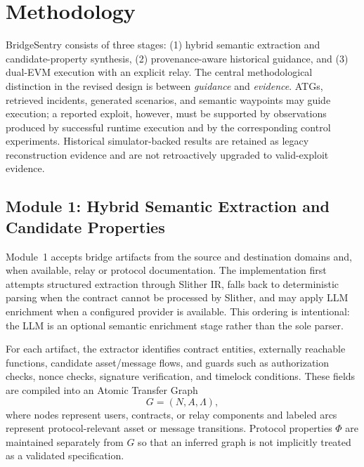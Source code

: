 
\section{Methodology}\label{sec:methodology}

BridgeSentry consists of three stages: (1) hybrid semantic extraction and candidate-property synthesis, (2) provenance-aware historical guidance, and (3) dual-EVM execution with an explicit relay. The central methodological distinction in the revised design is between \emph{guidance} and \emph{evidence}. ATGs, retrieved incidents, generated scenarios, and semantic waypoints may guide execution; a reported exploit, however, must be supported by observations produced by successful runtime execution and by the corresponding control experiments. Historical simulator-backed results are retained as legacy reconstruction evidence and are not retroactively upgraded to valid-exploit evidence.

\subsection{Module 1: Hybrid Semantic Extraction and Candidate Properties}

Module~1 accepts bridge artifacts from the source and destination domains and, when available, relay or protocol documentation. The implementation first attempts structured extraction through Slither IR, falls back to deterministic parsing when the contract cannot be processed by Slither, and may apply LLM enrichment when a configured provider is available. This ordering is intentional: the LLM is an optional semantic enrichment stage rather than the sole parser.

For each artifact, the extractor identifies contract entities, externally reachable functions, candidate asset/message flows, and guards such as authorization checks, nonce checks, signature verification, and timelock conditions. These fields are compiled into an Atomic Transfer Graph
\begin{equation}
    G=(N,A,\Lambda),
\end{equation}
where nodes represent users, contracts, or relay components and labeled arcs represent protocol-relevant asset or message transitions. Protocol properties $\Phi$ are maintained separately from $G$ so that an inferred graph is not implicitly treated as a validated specification.

